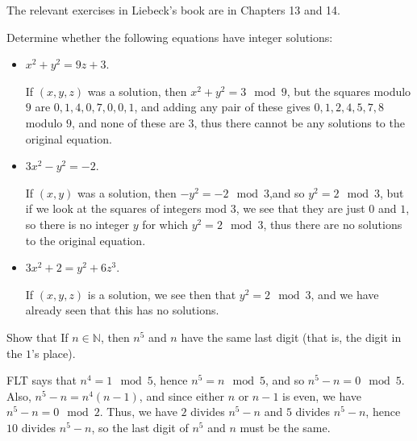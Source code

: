 \documentclass[11pt,dvipsnames]{book}
\numberwithin{equation}{section} %
\numberwithin{figure}{section} %
\numberwithin{table}{section} %
\begin{document}
The relevant exercises in Liebeck's book are in Chapters 13 and 14.

\begin{exercise} Determine whether the following equations have integer solutions:
\begin{itemize}
\item $x^2+y^2=9z+3$.

\begin{solution}
If $(x,y,z)$ was a solution, then $x^2+y^2 = 3\mod 9$, but the squares modulo $9$ are $0,1,4,0,7,0,0,1$, and adding any pair of these gives $0,1,2,4,5,7,8$ modulo $9$, and none of these are $3$, thus there cannot be any solutions to the original equation.
\end{solution}


\item $3x^2-y^2=-2$.

\begin{solution}
If $(x,y)$ was a solution, then $-y^2 = -2\mod 3$,and so $y^2 = 2\mod 3$, but if we look at the squares of integers mod 3, we see that they are just $0$ and $1$, so there is no integer $y$ for which $y^2 = 2 \mod 3$, thus there are no solutions to the original equation.
\end{solution}



\item $3x^2+2=y^2+6z^3$.

\begin{solution}
If $(x,y,z)$ is a  solution, we see then that $y^2 = 2\mod 3$, and we have already seen that this has no solutions. 

\end{solution}


\end{itemize}

\end{exercise}



\begin{exercise} Show that If $n\in\mathbb{N}$, then $n^5$ and $n$ have the same last digit (that is, the digit in the $1$'s place). 

\begin{solution}
FLT says that $n^{4} = 1 \mod 5$, hence $n^{5} = n \mod 5$, and so $n^{5}-n = 0\mod 5$. Also, $n^5-n=n^4(n-1)$, and since either $n$ or $n-1$ is even, we have $n^5-n = 0\mod 2$. Thus, we have $2$ divides $n^5-n$ and $5$ divides $ n^5-n$, hence $10$ divides $n^5-n$, so the last digit of $n^5$ and $n$ must be the same.
\end{solution}

\end{exercise}
\end{document}
